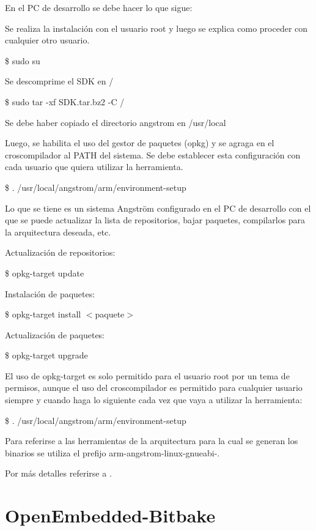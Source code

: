\bigskip
En el PC de desarrollo se debe hacer lo que sigue:

\bigskip
Se realiza la instalación con el usuario root y luego se explica como proceder con cualquier otro usuario.

\bigskip
\centerline{\$ sudo su}

\bigskip
Se descomprime el SDK en /

\centerline{\$ sudo tar -xf SDK.tar.bz2 -C /}

\bigskip
Se debe haber copiado el directorio angstrom en /usr/local

\bigskip
Luego, se habilita el uso del gestor de paquetes (opkg) y se agraga en el croscompilador al PATH del sistema. Se debe establecer esta configuración con cada usuario que quiera utilizar la herramienta.

\bigskip
\centerline{\$ . /usr/local/angstrom/arm/environment-setup}

\bigskip
Lo que se tiene es un sistema Angström configurado en el PC de desarrollo con el que se puede actualizar la lista de repositorios, bajar paquetes, compilarlos para la arquitectura deseada, etc.

\bigskip
Actualización de repositorios:

\bigskip
\centerline{\$ opkg-target update}

\bigskip
Instalación de paquetes:

\bigskip
\centerline{\$ opkg-target install $<$paquete$>$}

\bigskip
Actualización de paquetes:

\bigskip
\centerline{\$ opkg-target upgrade}

\bigskip
El uso de opkg-target es solo permitido para el usuario root por un tema de permisos, aunque el uso del croscompilador es permitido para cualquier usuario siempre y cuando haga lo siguiente cada vez que vaya a utilizar la herramienta:

\bigskip
\centerline{\$ . /usr/local/angstrom/arm/environment-setup}

\bigskip
Para referirse a las herramientas de la arquitectura para la cual se generan los binarios se utiliza el prefijo arm-angstrom-linux-gnueabi-.

\bigskip
Por más detalles referirse a \cite{conf_SDK}.


\section{OpenEmbedded-Bitbake}\label{anx_sw_oe}

